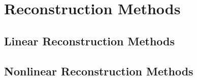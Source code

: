 \section{Reconstruction Methods}
\subsection{Linear Reconstruction Methods}










\subsection{Nonlinear Reconstruction Methods}